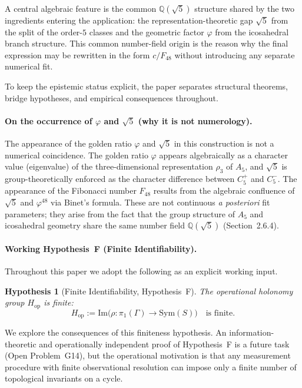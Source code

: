 \documentclass[sn-mathphys-num,Numbered]{sn-jnl}
\theoremstyle{thmstyleone}
\theoremstyle{thmstylethree}
\newtheorem{hypothesis}[theorem]{Hypothesis}
\theoremstyle{thmstyletwo}
\newcommand{\Sym}{\mathrm{Sym}}
\newcommand{\hop}{H_{\mathrm{op}}}
\newcommand{\Qsqrt}{\mathbb{Q}(\sqrt{5})}
\begin{document}
A central algebraic feature is the common $\Qsqrt$
structure shared by the two ingredients entering the application:
the representation-theoretic gap $\sqrt{5}$ from the split of the
order-$5$ classes and the geometric factor $\varphi$ from the
icosahedral branch structure. This common number-field origin is the
reason why the final expression may be rewritten in the form
$c/F_{48}$ without introducing any separate numerical fit.

To keep the epistemic status explicit, the paper separates structural
theorems, bridge hypotheses, and empirical consequences throughout.

\paragraph{On the occurrence of $\varphi$ and $\sqrt{5}$ (why it is not numerology).}
The appearance of the golden ratio $\varphi$ and $\sqrt{5}$ in this
construction is not a numerical coincidence. The golden ratio $\varphi$
appears algebraically as a character value (eigenvalue) of the
three-dimensional representation $\rho_3$ of $A_5$, and $\sqrt{5}$ is
group-theoretically enforced as the character difference between
$C_5^+$ and $C_5^-$. The appearance of the Fibonacci number $F_{48}$
results from the algebraic confluence of $\sqrt{5}$ and $\varphi^{48}$
via Binet's formula. These are not continuous \emph{a posteriori} fit
parameters; they arise from the fact that the group structure of $A_5$
and icosahedral geometry share the same number field $\Qsqrt$
(Section~2.6.4).

\paragraph{Working Hypothesis~F (Finite Identifiability).}
Throughout this paper we adopt the following as an explicit working
input.

\begin{hypothesis}[Finite Identifiability, Hypothesis~F]
\label{hyp:F}
The operational holonomy group $\hop$ is finite:
\[
  \hop := \mathrm{Im}\!\bigl(\rho:\pi_1(\Gamma)\to\Sym(S)\bigr)
  \quad \text{is finite.}
\]
\end{hypothesis}

We explore the consequences of this finiteness hypothesis.
An information-theoretic and operationally independent proof of
Hypothesis~F is a future task (Open Problem~G14), but the operational
motivation is that any measurement procedure with finite observational
resolution can impose only a finite number of topological invariants on
a cycle.
\end{document}
